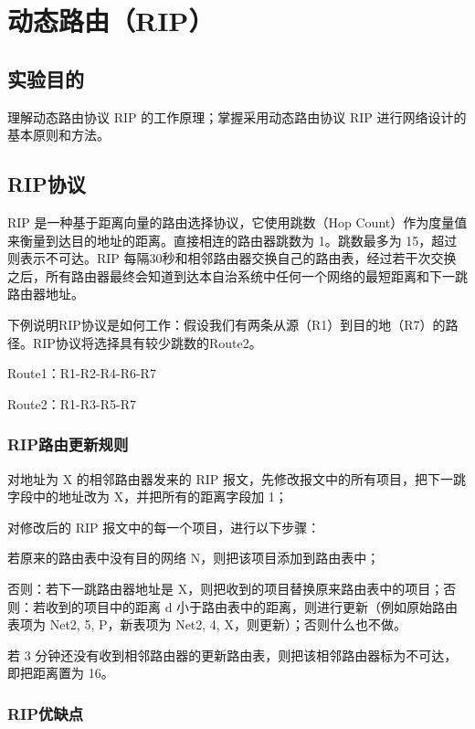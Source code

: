 \documentclass[a4paper,12pt]{report}
\begin{document}
\chapter{动态路由（RIP）
}
\setcounter{page}{1}
\begin{spacing}{1.5}
\songti{}

\section{实验目的}
理解动态路由协议 RIP 的工作原理；掌握采用动态路由协议 RIP 进行网络设计的基本原则和方法。

\section{RIP协议}

RIP 是一种基于距离向量的路由选择协议，它使用跳数（Hop Count）作为度量值来衡量到达目的地址的距离。直接相连的路由器跳数为 1。跳数最多为 15，超过则表示不可达。RIP 每隔30秒和相邻路由器交换自己的路由表，经过若干次交换之后，所有路由器最终会知道到达本自治系统中任何一个网络的最短距离和下一跳路由器地址。

下例说明RIP协议是如何工作：假设我们有两条从源（R1）到目的地（R7）的路径。RIP协议将选择具有较少跳数的Route2。

Route1：R1-R2-R4-R6-R7

Route2：R1-R3-R5-R7


\subsection{RIP路由更新规则}

对地址为 X 的相邻路由器发来的 RIP 报文，先修改报文中的所有项目，把下一跳字段中的地址改为 X，并把所有的距离字段加 1；

对修改后的 RIP 报文中的每一个项目，进行以下步骤：

若原来的路由表中没有目的网络 N，则把该项目添加到路由表中；

否则：若下一跳路由器地址是 X，则把收到的项目替换原来路由表中的项目；否则：若收到的项目中的距离 d 小于路由表中的距离，则进行更新（例如原始路由表项为 Net2, 5, P，新表项为 Net2, 4, X，则更新）；否则什么也不做。

若 3 分钟还没有收到相邻路由器的更新路由表，则把该相邻路由器标为不可达，即把距离置为 16。

\subsection{RIP优缺点}


\end{spacing}
\end{document}
